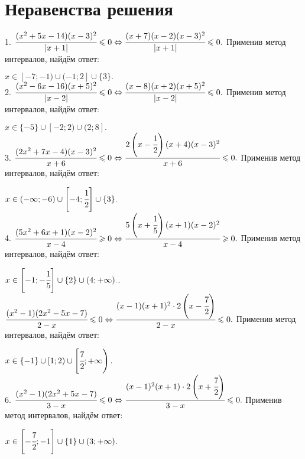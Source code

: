 \section{Неравенства решения}
1. $\cfrac{(x^2+5x-14)(x-3)^2}{|x+1|}\leqslant0\Leftrightarrow\cfrac{(x+7)(x-2)(x-3)^2}{|x+1|}\leqslant0.$ Применив метод интервалов, найдём ответ:
\begin{figure}[ht!]
\end{figure}
$x\in[-7;-1)\cup(-1;2]\cup\{3\}.$\\
2. $\cfrac{(x^2-6x-16)(x+5)^2}{|x-2|}\leqslant0\Leftrightarrow\cfrac{(x-8)(x+2)(x+5)^2}{|x-2|}\leqslant0.$ Применив метод интервалов, найдём ответ:
\begin{figure}[ht!]
\end{figure}
$x\in\{-5\}\cup[-2;2)\cup(2;8].$\\
3. $\cfrac{(2x^2+7x-4)(x-3)^2}{x+6}\leqslant0\Leftrightarrow\cfrac{2\left(x-\cfrac{1}{2}\right)(x+4)(x-3)^2}{x+6}\leqslant0.$ Применив метод интервалов, найдём ответ:
\begin{figure}[ht!]
\end{figure}
$x\in(-\infty; -6)\cup\left[-4;\cfrac{1}{2}\right]\cup\{3\}.$\\
4. $\cfrac{(5x^2+6x+1)(x-2)^2}{x-4}\geqslant0\Leftrightarrow\cfrac{5\left(x+\cfrac{1}{5}\right)(x+1)(x-2)^2}{x-4}\geqslant0.$ Применив метод интервалов, найдём ответ:
\begin{figure}[ht!]
\end{figure}
$x\in\left[-1;-\cfrac{1}{5}\right]\cup\{2\}\cup(4;+\infty).$\newpage{}. $\cfrac{(x^2-1)(2x^2-5x-7)}{2-x}\leqslant0\Leftrightarrow\cfrac{(x-1)(x+1)^2\cdot 2\left(x-\cfrac{7}{2}\right)}{2-x}\leqslant0.$ Применив метод интервалов, найдём ответ:
\begin{figure}[ht!]
\end{figure}
$x\in\{-1\}\cup[1;2)\cup\left[\cfrac{7}{2};+\infty\right).$\\
6. $\cfrac{(x^2-1)(2x^2+5x-7)}{3-x}\leqslant0\Leftrightarrow\cfrac{(x-1)^2(x+1)\cdot 2\left(x+\cfrac{7}{2}\right)}{3-x}\leqslant0.$ Применив метод интервалов, найдём ответ:
\begin{figure}[ht!]
\end{figure}
$x\in\left[-\cfrac{7}{2};-1\right]\cup\{1\}\cup(3;+\infty).$\\
